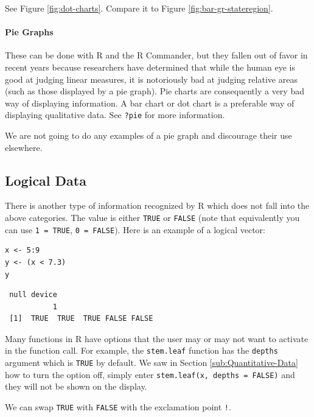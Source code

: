 \documentclass[captions=tableheading]{scrbook}
\begin{document}
\begin{example}
See Figure \ref{fig:dot-charts}. Compare it to Figure \ref{fig:bar-gr-stateregion}.

\end{example}

\paragraph*{Pie Graphs}
\label{par:Pie-Graphs}

These can be done with \textsf{R} and the \textsf{R} Commander, but they fallen out of favor in recent years because researchers have determined that while the human eye is good at judging linear measures, it is notoriously bad at judging relative areas (such as those displayed by a pie graph). Pie charts are consequently a very bad way of displaying information. A bar chart or dot chart is a preferable way of displaying qualitative data. See \texttt{?pie} for more information.

We are not going to do any examples of a pie graph and discourage their use elsewhere. 
\subsection{Logical Data}
\label{sec-2-1-5}

\label{sub:Logical-Data}

There is another type of information recognized by \textsf{R} which does not fall into the above categories. The value is either \texttt{TRUE} or \texttt{FALSE} (note that equivalently you can use \texttt{1 = TRUE}, \texttt{0 = FALSE}). Here is an example of a logical vector:


\begin{verbatim}
x <- 5:9
y <- (x < 7.3)
y
\end{verbatim}

\begin{verbatim}
 null device 
           1
 [1]  TRUE  TRUE  TRUE FALSE FALSE
\end{verbatim}

Many functions in \textsf{R} have options that the user may or may not want to activate in the function call. For example, the \texttt{stem.leaf} function has the \texttt{depths} argument which is \texttt{TRUE} by default. We saw in Section \ref{sub:Quantitative-Data} how to turn the option off, simply enter \texttt{stem.leaf(x, depths = FALSE)} and they will not be shown on the display.

We can swap \texttt{TRUE} with \texttt{FALSE} with the exclamation point \texttt{!}.
\end{document}
